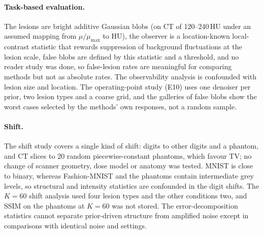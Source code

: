 \paragraph{Task-based evaluation.} The lesions are bright additive Gaussian blobs (on CT of 120--240\,HU under an assumed mapping from $\mu/\mu_{\max}$ to HU), the observer is a location-known local-contrast statistic that rewards suppression of background fluctuations at the lesion scale, false blobs are defined by this statistic and a threshold, and no reader study was done, so false-lesion rates are meaningful for comparing methods but not as absolute rates. The observability analysis is confounded with lesion size and location. The operating-point study (E10) uses one denoiser per prior, two lesion types and a coarse grid, and the galleries of false blobs show the worst cases selected by the methods' own responses, not a random sample.

\paragraph{Shift.} The shift study covers a single kind of shift: digits to other digits and a phantom, and CT slices to 20 random piecewise-constant phantoms, which favour TV; no change of scanner geometry, dose model or anatomy was tested. MNIST is close to binary, whereas Fashion-MNIST and the phantoms contain intermediate grey levels, so structural and intensity statistics are confounded in the digit shifts. The $K=60$ shift analysis used four lesion types and the other conditions two, and SSIM on the phantoms at $K=60$ was not stored. The error-decomposition statistics cannot separate prior-driven structure from amplified noise except in comparisons with identical noise and settings.